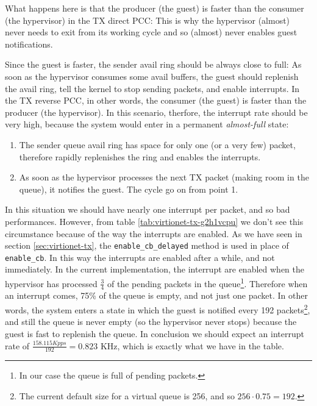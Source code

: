 What happens here is that the producer (the guest) is faster than the consumer (the hypervisor) in the TX direct PCC: This is why the 
hypervisor (almost) never needs to exit from its working cycle and so (almost) never enables guest notifications.

\vspace{0.5cm}

Since the guest is faster, the sender avail ring
should be always close to full: As soon as the hypervisor consumes some avail buffers, the guest should replenish the avail ring, tell the 
kernel to stop sending packets, and enable interrupts. In the TX reverse PCC, in other words, the consumer (the guest) is faster than the
producer (the hypervisor).
In this scenario, therfore, the interrupt rate should be very high, because the system would
enter in a permanent \emph{almost-full} state:
\begin{enumerate}
  \item The sender queue avail ring has space for only one (or a very few) packet, therefore rapidly replenishes the ring and enables the
	interrupts.
  \item As soon as the hypervisor processes the next TX packet (making room in the queue), it notifies the guest. The cycle go on from
	point 1.
\end{enumerate}
In this situation we should have nearly one interrupt per packet, and so bad performances. However, from table 
\ref{tab:virtionet-tx-g2h1vcpu} we don't see this circumstance because of the way the interrupts are enabled. As we have seen in 
section \ref{sec:virtionet-tx}, the \texttt{enable\_cb\_delayed} method is used in place of \texttt{enable\_cb}. In this way the interrupts
are enabled after a while, and not immediately. In the current implementation, the interrupt are enabled when the hypervisor has processed
$\frac{3}{4}$ of the pending packets in the queue\footnote{In our case the queue is full of pending packets.}. Therefore when an interrupt
comes, 75\% of the queue is empty, and not just one packet. In other words, the system enters a state in which the guest is notified every
192 packets\footnote{The current default size for a virtual queue is 256, and so $256 \cdot 0.75 = 192$.}, and still the queue is never
empty (so the hypervisor never stops) because the guest is fast to replenish the queue. In conclusion we should expect an interrupt rate of
$\frac{158.115 Kpps}{192} = 0.823$ KHz, which is exactly what we have in the table.

\vspace{0.5cm}

